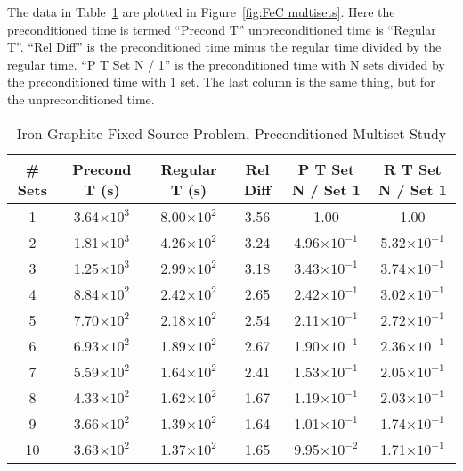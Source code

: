 The data in Table~\ref{table:FeC multisets} are plotted in Figure~\ref{fig:FeC multisets}. Here the preconditioned time is termed ``Precond T''  unpreconditioned time is ``Regular T''. ``Rel Diff'' is the preconditioned time minus the regular time divided by the regular time. ``P T Set N / 1'' is the preconditioned time with N sets divided by the preconditioned time with 1 set. The last column is the same thing, but for the unpreconditioned time.
\begin{table}[!h]
\caption{Iron Graphite Fixed Source Problem, Preconditioned Multiset Study}
\begin{center}
\begin{tabular}{|c |c |c |c |c |c|}
\hline
\# Sets & Precond T (s) & Regular T (s) & Rel Diff & P T Set N / Set 1 & R T Set N / Set 1 \\[0.5ex]
\hline
1   & 3.64$\times 10^{3}$  & 8.00$\times 10^{2}$ & 3.56 & 1.00                              & 1.00 \\
2   & 1.81$\times 10^{3}$	& 4.26$\times 10^{2}$ & 3.24 & 4.96$\times 10^{-1}$ & 5.32$\times 10^{-1}$ \\
3   & 1.25$\times 10^{3}$	& 2.99$\times 10^{2}$ & 3.18 & 3.43$\times 10^{-1}$ & 3.74$\times 10^{-1}$ \\
4   & 8.84$\times 10^{2}$	& 2.42$\times 10^{2}$ & 2.65 & 2.42$\times 10^{-1}$ & 3.02$\times 10^{-1}$ \\ 
5   & 7.70$\times 10^{2}$	& 2.18$\times 10^{2}$ & 2.54 & 2.11$\times 10^{-1}$ & 2.72$\times 10^{-1}$ \\
6   & 6.93$\times 10^{2}$	& 1.89$\times 10^{2}$ & 2.67 & 1.90$\times 10^{-1}$ & 2.36$\times 10^{-1}$ \\
7   & 5.59$\times 10^{2}$	& 1.64$\times 10^{2}$ & 2.41 & 1.53$\times 10^{-1}$ & 2.05$\times 10^{-1}$ \\
8   & 4.33$\times 10^{2}$	& 1.62$\times 10^{2}$ & 1.67 & 1.19$\times 10^{-1}$ & 2.03$\times 10^{-1}$ \\
9   & 3.66$\times 10^{2}$	& 1.39$\times 10^{2}$ & 1.64 & 1.01$\times 10^{-1}$ & 1.74$\times 10^{-1}$ \\
10 & 3.63$\times 10^{2}$	& 1.37$\times 10^{2}$ & 1.65 & 9.95$\times 10^{-2}$ & 1.71$\times 10^{-1}$ \\
\hline 
\end{tabular} 
\end{center}
\label{table:FeC multisets}
\end{table}

